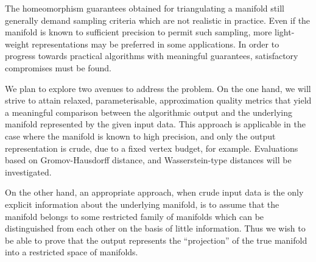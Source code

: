 The homeomorphism guarantees obtained for triangulating a manifold
still generally demand sampling criteria which are not realistic in
practice. Even if the manifold is known to sufficient precision to
permit such sampling, more light-weight representations may be
preferred in some applications.  In order to progress towards
practical algorithms with meaningful guarantees, satisfactory
compromises must be found.
%
%

We plan to explore two avenues to address the problem. On the one
hand, we will strive to attain relaxed, parameterisable, approximation
quality metrics that yield a meaningful comparison between the
algorithmic output and the underlying manifold represented by the
given input data. This approach is applicable in the case where the
manifold is known to high precision, and only the output
representation is crude, due to a fixed vertex budget, for
example. Evaluations based on Gromov-Hausdorff distance,
and Wasserstein-type distances will be investigated.

On the other hand, an appropriate approach, when crude input
data is the only explicit information about the underlying manifold,
is to assume that the manifold belongs to some restricted family of
manifolds which can be distinguished from each other on the basis of
little information. Thus we wish to be able to prove that the output
represents the ``projection'' of the true manifold into a restricted
space of manifolds.

